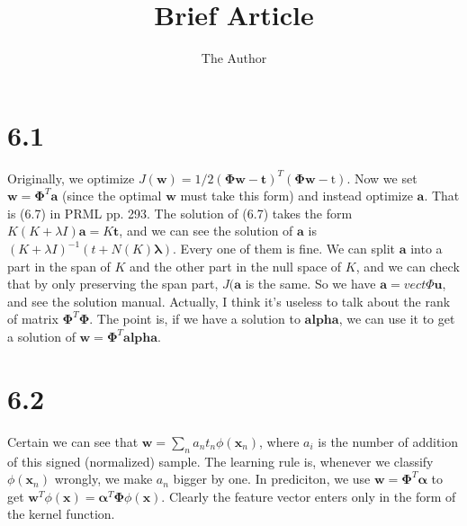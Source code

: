 \documentclass[12pt]{article}
\title{Brief Article}
\author{The Author}
\newcommand{\vect}[1]{\boldsymbol{#1}}
\begin{document}
\maketitle





\section{6.1}
Originally, we optimize $J(\vect{w})  = 1/2 (\vect{\Phi} \vect{w} - \vect{{t}})^T (\vect{\Phi} \vect{w} - \vect{\mathrm{t}})$. Now we set $\vect{w} = \vect{\Phi}^T \vect{a}$ (since the optimal $\vect{w}$ must take this form) and instead optimize $\vect{a}$. That is (6.7) in PRML pp. 293. The solution of (6.7) takes the form $K(K+\lambda I) \vect{a} = K \vect{t}$, and we can see the solution of $\vect{a}$ is $(K+\lambda I)^{-1}(t+N(K) \vect{\lambda})$. Every one of them is fine. We can split $\vect{a}$ into a part in  the span of $K$ and the other part in  the null space of $K$, and we can check that by only preserving the span part, $J(\vect{a}$ is the same. So we have $\vect{a} = vect{\Phi} \vect{u}$, and see the solution manual. Actually, I think it's useless to talk about the rank of matrix $\vect{\Phi}^T \vect{\Phi}$. The point is, if we have a solution to $\vect{alpha}$, we can use it to get a solution of $\vect{w} = \vect{\Phi}^T \vect{alpha} $.


\section{6.2}
Certain we can see that $\vect{w} = \sum_{n} a_n t_n \phi(\vect{x}_n ) $, where $a_i$ is the number of addition of this signed (normalized) sample. The learning rule is, whenever we classify $\phi(\vect{x}_n )$ wrongly, we make $a_n$ bigger by one. In prediciton, we use $\vect{w} = \vect{\Phi}^T \vect{\alpha}$ to get $\vect{w}^T \phi(\vect{x})= \vect{\alpha}^T \vect{\Phi}\phi(\vect{x}) $. Clearly the feature vector enters only in the form of the kernel function.
\end{document}
